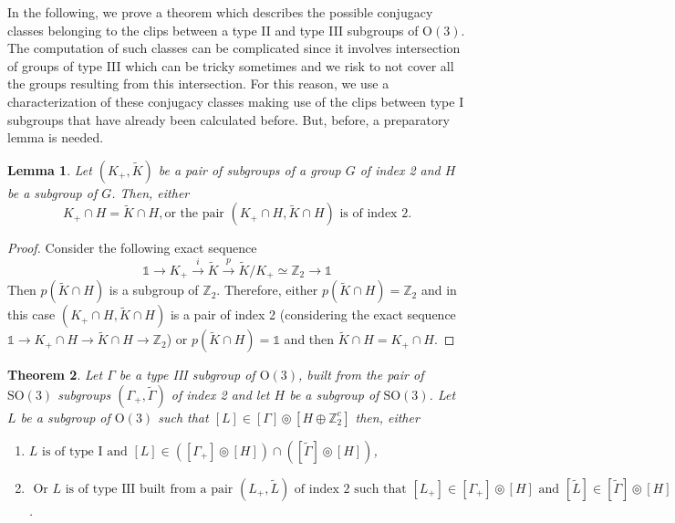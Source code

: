 \documentclass[11pt,a4paper]{amsart}
\newtheorem{thm}{Theorem}[section]
\newtheorem{lem}[thm]{Lemma}
\theoremstyle{definition}
\newcommand{\ZZ}{\mathbb{Z}}                %
\newcommand{\OO}{\mathrm{O}}                %
\newcommand{\SO}{\mathrm{SO}}               %
\newcommand{\1}{\mathds{1}}		            %
\begin{document}
In the following, we prove a theorem which describes the possible conjugacy classes belonging to the clips between a type II and type III subgroups of $\OO(3)$. The computation of such classes can be complicated since it involves intersection of groups of type III which can be tricky sometimes and we risk to not cover all the groups resulting from this intersection. For this reason, we use a characterization of these conjugacy classes making use of the clips between type I subgroups that have already been calculated before. But, before, a preparatory lemma is needed.

\begin{lem}\label{lem:index2}
	Let $(K_+,\tilde{K})$ be a pair of subgroups of a group $G$ of index 2 and $H$ be a subgroup of $G$. Then, either
	\begin{equation*}
		K_+\cap H= \tilde{K}\cap H, \text{or the pair } (K_+\cap H,\tilde{K}\cap H) \text{ is of index 2}.
	\end{equation*} 
\end{lem}



\begin{proof}
		Consider the following exact sequence
		\begin{equation*}
			\1\to K_+\overset{i}{\to} \tilde{K}\overset{p}{\to} \tilde{K}/K_+\simeq \ZZ_2\to \1
		\end{equation*}
	Then $p(\tilde{K}\cap H)$ is a subgroup of $\ZZ_2$. Therefore, either  $p(\tilde{K}\cap H)=\ZZ_2$ and in this case $(K_+\cap H, \tilde{K}\cap H)$ is a pair of index 2 (considering the exact sequence $\1\to K_+\cap H\to \tilde{K}\cap H\to \ZZ_2$) or  $p(\tilde{K}\cap H)=\1$ and then $\tilde{K}\cap H=K_+\cap H$.
\end{proof}



\begin{thm}\label{thm:main}
	Let $\Gamma$ be a type III subgroup of $\OO(3)$, built from the pair of $\SO(3)$ subgroups $(\Gamma_+,\tilde{\Gamma})$ of index 2 and let $H$ be a subgroup of $\SO(3)$. Let $L$ be a subgroup of $\OO(3)$ such that $[L]\in [\Gamma]\circledcirc[H\oplus\ZZ_2^c]$ then, either
	\begin{enumerate}
		\item $L \text{ is of type I and } [L]\in ([\Gamma_+]\circledcirc [H])\cap ([\tilde{\Gamma}]\circledcirc[H])$, 
		\item $\text{ Or } L \text{ is of type III built from a pair } (L_+,\tilde{L})  \text{ of index 2 such that } [L_+]\in [\Gamma_+]\circledcirc[H] \text{ and }[\tilde{L}]\in [\tilde{\Gamma}]\circledcirc[H]$.
	\end{enumerate}	
\end{thm}
\end{document}
